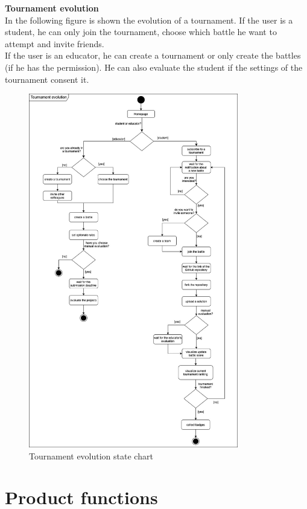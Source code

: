\clearpage
\textbf{Tournament evolution}\\
In the following figure is shown the evolution of a tournament. If the user is a student, he can only join
the tournament, choose which battle he want to attempt and invite friends.\\ If the user is an educator, he
can create a tournament or only create the battles (if he has the permission). He can also evaluate 
the student if the settings of the tournament consent it.
\begin{figure} [H]
  \centering
  \includegraphics[width=0.815\textwidth]{images/Tournament_evolution.jpg}
  \caption{Tournament evolution state chart}
\end{figure} \vspace{1cm}

\section{Product functions}
